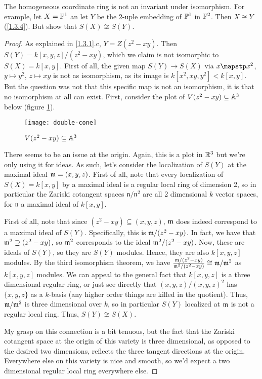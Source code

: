 \label{1.3.9}

The homogeneous coordinate ring is not an invariant under isomorphism. For example, let $X = \P^1$ an let $Y$ be the $2$-uple embedding of $\P^1$ in $\P^2$. Then $X \cong Y$ (\ref{1.3.4}). But show that $S(X) \not \cong S(Y)$.

\begin{proof}
    As explained in \ref{1.3.1}.c, $Y = Z(z^2 - xy)$. Then $S(Y) = k[x, y, z] / (z^2 - xy)$, which we claim is not isomorphic to $S(X) = k[x, y]$. First of all, the given map $S(Y) \longrightarrow S(X)$ via $x \mapstp x^2$, $y \mapsto y^2$, $z \mapsto xy$ is not as isomorphism, as its image is $k[x^2, xy, y^2] < k[x, y]$. But the question was not that this specific map is not an isomorphism, it is that no isomorphism at all can exist. First, consider the plot of $V(z^2 - xy) \subseteq \A^3$ below (figure \ref{fig1.3.2}).

    \begin{figure}[h]
        \centering
        \texttt{[image: double-cone]}
        \caption{$V(z^2 - xy) \subseteq \A^3$}
        \label{fig1.3.2}
    \end{figure}

    There seems to be an issue at the origin. Again, this is a plot in $\R^3$ but we're only using it for ideas. As such, let's consider the localization of $S(Y)$ at the maximal ideal $\m = (x, y, z)$. First of all, note that every localization of $S(X) = k[x, y]$ by a maximal ideal is a regular local ring of dimension 2, so in particular the Zariski cotangent spaces $\mathfrak n/\mathfrak n^2$ are all 2 dimensional $k$ vector spaces, for $\mathfrak n$ a maximal ideal of $k[x, y]$.

    First of all, note that since $(z^2 - xy) \subseteq (x, y, z)$, $\m$ does indeed correspond to a maximal ideal of $S(Y)$. Specifically, this is $\m / (z^2 - xy)$. In fact, we have that $\m^2 \supseteq (z^2 - xy)$, so $\m^2$ corresponds to the ideal $\m^2 / (z^2 - xy)$. Now, these are ideals of $S(Y)$, so they are $S(Y)$ modules. Hence, they are also $k[x, y, z]$ modules. By the third isomorphism theorem, we have $\frac{\m / (z^2 - xy)}{\m^2 / (z^2 - xy)} \cong \m / \m^2$ as $k[x, y, z]$ modules. We can appeal to the general fact that $k[x, y, z]$ is a three dimensional regular ring, or just see directly that $(x, y, z) / (x, y, z)^2$ has $\{x, y, z\}$ as a $k$-basis (any higher order things are killed in the quotient). Thus, $\m / \m^2$ is three dimensional over $k$, so in particular $S(Y)$ localized at $\m$ is not a regular local ring. Thus, $S(Y) \not \cong S(X)$.

    My grasp on this connection is a bit tenuous, but the fact that the Zariski cotangent space at the origin of this variety is three dimensional, as opposed to the desired two dimensions, reflects the three tangent directions at the origin. Everywhere else on this variety is nice and smooth, so we'd expect a two dimensional regular local ring everywhere else.
\end{proof}
